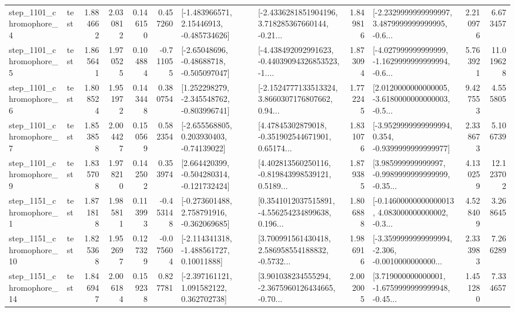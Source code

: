 \begin{tabular}{llrrrrllrlrr}
  step\_1101\_chromophore\_4 &      test &      1.884662 &    2.030812 &      0.146150 &  0.457260 &    [-1.483966571, 2.15446913, -0.485734626] &  [-2.4336281851904196, 3.718285367660144, -0.21... &       1.849816 &  [-2.2329999999999997, 3.4879999999999995, -0.6... &            2.210976 &          6.673457 \\
  step\_1101\_chromophore\_5 &      test &      1.865641 &    1.970525 &      0.104884 & -0.711055 &    [-2.65048696, -0.48688718, -0.505097047] &  [-4.438492092991623, -0.44039094326853523, -1.... &       1.873094 &  [-4.027999999999999, -1.1629999999999994, -0.6... &            5.763921 &         11.019628 \\
  step\_1101\_chromophore\_6 &      test &      1.808524 &    1.951972 &      0.143448 &  0.380754 &   [1.252298279, -2.345548762, -0.803996741] &  [-2.1524777133513324, 3.8660307176807662, 0.94... &       1.772245 &  [2.0120000000000005, -3.6180000000000003, -0.5... &            9.427553 &          4.555805 \\
  step\_1101\_chromophore\_7 &      test &      1.853858 &    2.004427 &      0.150569 &  0.582354 &    [-2.655568805, 0.203930403, -0.74139022] &  [4.47845302879018, -0.351902544671901, 0.65174... &       1.831076 &  [-3.9529999999999994, 0.354, -0.9399999999999977] &            2.338673 &          5.106739 \\
  step\_1101\_chromophore\_9 &      test &      1.835708 &    1.978210 &      0.142502 &  0.353974 &   [2.664420399, -0.504280314, -0.121732424] &  [4.402813560250116, -0.819843998539121, 0.5189... &       1.879385 &  [3.985999999999997, -0.9989999999999999, -0.35... &            4.130259 &         12.123702 \\
  step\_1151\_chromophore\_1 &      test &      1.871818 &    1.985811 &      0.113993 & -0.453148 &   [-0.273601488, 2.758791916, -0.362069685] &  [0.3541012037515891, -4.556254234899638, 0.196... &       1.806888 &  [-0.14600000000000013, 4.083000000000002, -0.3... &            4.528409 &          3.268645 \\
 step\_1151\_chromophore\_10 &      test &      1.825368 &    1.952697 &      0.127329 & -0.075604 &    [-2.114341318, -1.488561727, 0.10011888] &  [3.700991561430418, 2.586958554188832, -0.5732... &       1.986916 &  [-3.3599999999999994, -2.306, -0.0010000000000... &            2.333983 &          7.266289 \\
 step\_1151\_chromophore\_14 &      test &      1.846947 &    2.006184 &      0.159238 &  0.827781 &    [-2.397161121, 1.091582122, 0.362702738] &  [3.901038234555294, -2.3675960126434665, -0.70... &       2.002005 &  [3.719000000000001, -1.6759999999999948, -0.45... &            1.451280 &          7.334657 \\

\end{tabular}
